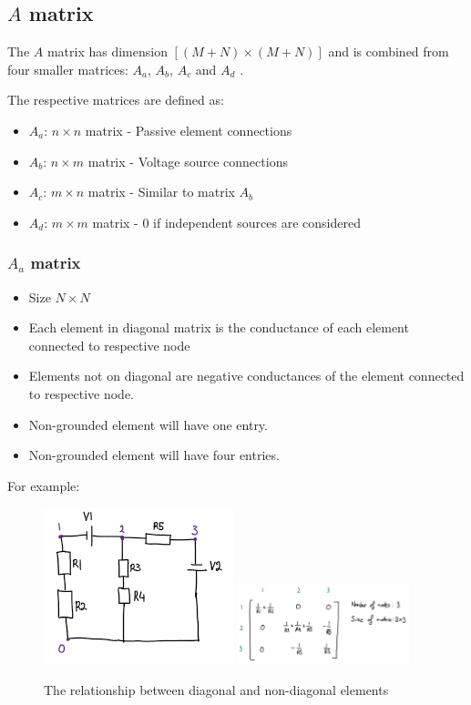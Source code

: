 \documentclass[a4paper, titlepage]{article}
\begin{document}
    \subsection{$A$ matrix}
    The $A$ matrix has dimension $[(M+N) \times (M+N)]$ and is combined from four smaller matrices: $A_a$, $A_b$, $A_c$ and $A_d$ \cite{nodeanalysis}.
    \par
    The respective matrices are defined as:
    \begin{itemize}
        \item $A_a$: $n \times n$ matrix - Passive element connections
        \item $A_b$: $n \times m$ matrix - Voltage source connections 
        \item $A_c$: $m \times n$ matrix - Similar to matrix $A_b$
        \item $A_d$: $m \times m$ matrix - 0 if independent sources are considered
    \end{itemize}

    \subsubsection{$A_a$ matrix}
    \begin{itemize}
        \item Size $N\times N$
        \item Each element in diagonal matrix is the conductance of each element connected to respective node
        \item Elements not on diagonal are negative conductances of the element connected to respective node.
        \item Non-grounded element will have one entry.
        \item Non-grounded element will have four entries.
    \end{itemize}
    For example:
    \begin{figure}[htp]
        \centering
        \includegraphics[width=.2\textwidth,scale=1]{Circuit2}
        \includegraphics[width=50mm,scale=1]{Matrix2}
        \caption{The relationship between diagonal and non-diagonal elements}
        \label{fig:figure3}
    \end{figure}
    \pagebreak
\end{document}
